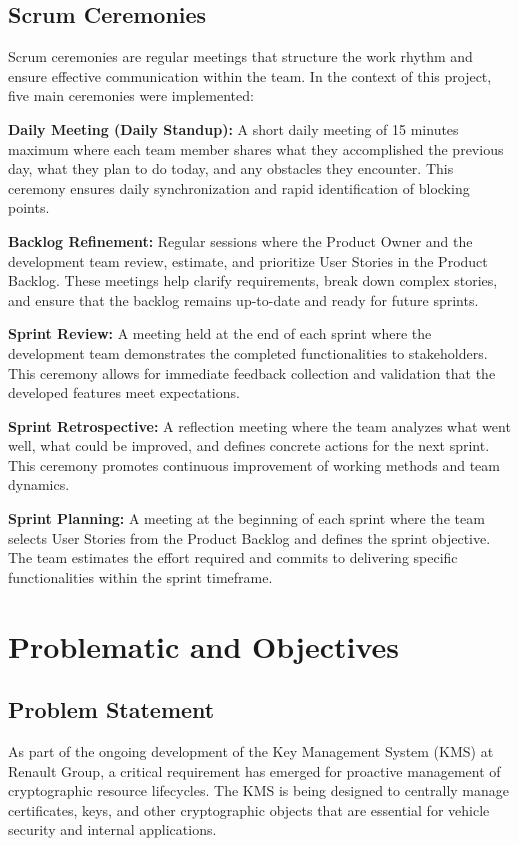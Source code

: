 \subsection{Scrum Ceremonies}

Scrum ceremonies are regular meetings that structure the work rhythm and ensure effective communication within the team. In the context of this project, five main ceremonies were implemented:

\textbf{Daily Meeting (Daily Standup):} A short daily meeting of 15 minutes maximum where each team member shares what they accomplished the previous day, what they plan to do today, and any obstacles they encounter. This ceremony ensures daily synchronization and rapid identification of blocking points.

\textbf{Backlog Refinement:} Regular sessions where the Product Owner and the development team review, estimate, and prioritize User Stories in the Product Backlog. These meetings help clarify requirements, break down complex stories, and ensure that the backlog remains up-to-date and ready for future sprints.

\textbf{Sprint Review:} A meeting held at the end of each sprint where the development team demonstrates the completed functionalities to stakeholders. This ceremony allows for immediate feedback collection and validation that the developed features meet expectations.

\textbf{Sprint Retrospective:} A reflection meeting where the team analyzes what went well, what could be improved, and defines concrete actions for the next sprint. This ceremony promotes continuous improvement of working methods and team dynamics.

\textbf{Sprint Planning:} A meeting at the beginning of each sprint where the team selects User Stories from the Product Backlog and defines the sprint objective. The team estimates the effort required and commits to delivering specific functionalities within the sprint timeframe.

\section{Problematic and Objectives}

\subsection{Problem Statement}

As part of the ongoing development of the Key Management System (KMS) at Renault Group, a critical requirement has emerged for proactive management of cryptographic resource lifecycles. The KMS is being designed to centrally manage certificates, keys, and other cryptographic objects that are essential for vehicle security and internal applications.

